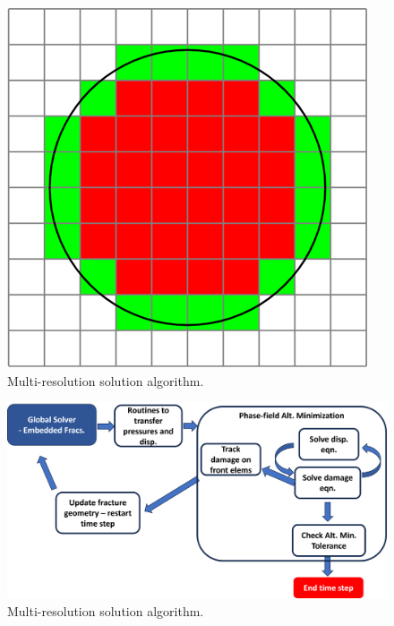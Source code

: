 \begin{figure}[h]
    \centering
    \includegraphics[width=0.5\linewidth]{Chapter4/figures/larger_penny.png}
    \caption{Multi-resolution solution algorithm.}
    \label{fig:lorem3}
\end{figure}

\begin{figure}[h]
    \centering
    \includegraphics[width=\linewidth]{Chapter4/figures/planar3D_algorithm.png}
    \caption{Multi-resolution solution algorithm.}
    \label{fig:lorem5}
\end{figure}
